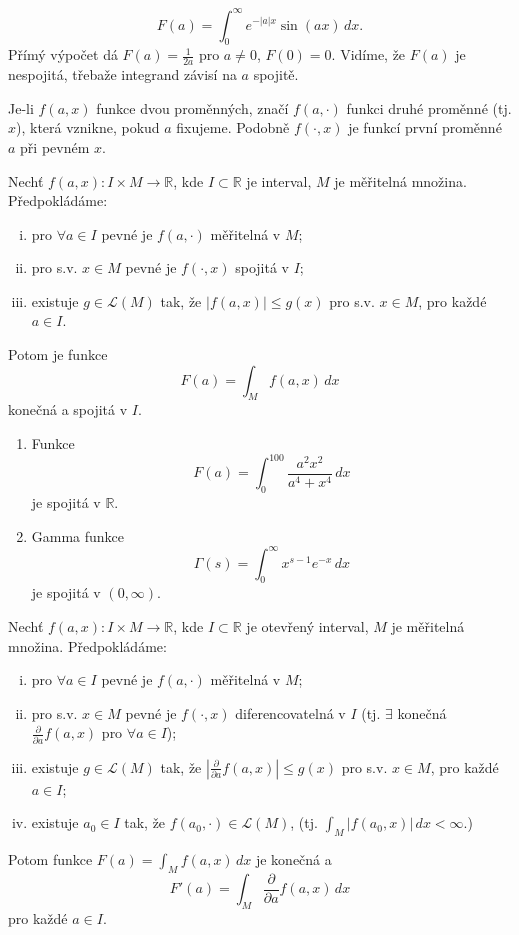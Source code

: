 \begin{priklad}
\[
F(a) = \int_0^{\infty} e^{-|a|x} \sin(ax) \, dx.
\]
Přímý výpočet dá $F(a) = \frac{1}{2a}$ pro $a \ne 0$, $F(0) = 0$.
Vidíme, že $F(a)$ je nespojitá, třebaže integrand závisí na $a$
spojitě.
\end{priklad}

\begin{poznamka}
Je-li $f(a, x)$ funkce dvou proměnných, značí $f(a, \cdot)$ funkci
druhé proměnné (tj. $x$), která vznikne, pokud $a$ fixujeme. Podobně
$f(\cdot, x)$ je funkcí první proměnné $a$ při pevném $x$.
\end{poznamka}

\begin{veta}
Nechť $f(a, x) : I \times M \to \mathbb{R}$, kde
$I \subset \mathbb{R}$ je interval, $M$ je měřitelná množina.
Předpokládáme:
\begin{enumerate}[i.]
\item pro $\forall a \in I$ pevné je $f(a, \cdot)$ měřitelná v $M$;
\item pro s.v. $x \in M$ pevné je $f(\cdot, x)$ spojitá v $I$;
\item existuje $g \in \mathcal{L}(M)$ tak, že $|f(a, x)| \le g(x)$ pro
s.v. $x \in M$, pro každé $a \in I$.
\end{enumerate}
Potom je funkce
\[
F(a) = \int_M f(a, x) \, dx
\]
konečná a spojitá v $I$.
\end{veta}

\begin{priklad}
\begin{enumerate}[1.]
\item Funkce
\[
F(a) = \int_0^{100} \frac{a^2x^2}{a^4 + x^4} \, dx
\]
je spojitá v $\mathbb{R}$.

\item Gamma funkce
\[
\Gamma(s) = \int_0^{\infty} x^{s-1} e^{-x} \, dx
\]
je spojitá v $(0, \infty)$.
\end{enumerate}
\end{priklad}

\begin{veta}
Nechť $f(a, x) : I \times M \to \mathbb{R}$, kde
$I \subset \mathbb{R}$ je otevřený interval, $M$ je měřitelná
množina. Předpokládáme:
\begin{enumerate}[i.]
\item pro $\forall a \in I$ pevné je $f(a, \cdot)$ měřitelná v $M$;
\item pro s.v. $x \in M$ pevné je $f(\cdot, x)$ diferencovatelná v $I$
(tj. $\exists$ konečná $\frac{\partial}{\partial a} f(a, x)$ pro
$\forall a \in I$);
\item existuje $g \in \mathcal{L}(M)$ tak, že
$\left| \frac{\partial}{\partial a} f(a, x) \right| \le g(x)$ pro s.v.
$x \in M$, pro každé $a \in I$;
\item existuje $a_0 \in I$ tak, že $f(a_0, \cdot) \in \mathcal{L}(M)$,
(tj. $\int_M |f(a_0, x)| \, dx < \infty$.)
\end{enumerate}
Potom funkce $F(a) = \int_M f(a, x) \, dx$ je konečná a
\[
F'(a) = \int_M \frac{\partial}{\partial a} f(a, x) \, dx
\]
pro každé $a \in I$.
\end{veta}

